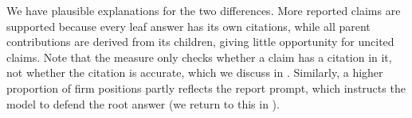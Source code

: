 We have plausible explanations for the two differences. More reported claims are supported because every leaf answer has its own citations, while all parent contributions are derived from its children, giving little opportunity for uncited claims. Note that the measure only checks whether a claim has a citation in it, not whether the citation is accurate, which we discuss in . Similarly, a higher proportion of firm positions partly reflects the report prompt, which instructs the model to defend the root answer (we return to this in ).
